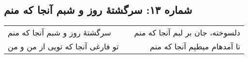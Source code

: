 \begin{center}
\section*{شماره ۱۳: سرگشتۀ روز و شبم آنجا که منم}
\label{sec:013}
\begin{longtable}{l p{0.5cm} r}
سرگشتهٔ روز و شبم آنجا که منم
&&
دلسوخته، جان بر لبم آنجا که منم
\\
تو فارغی آنجا که تویی از من و من
&&
تا آمدهام میطپم آنجا که منم
\\
\end{longtable}
\end{center}
